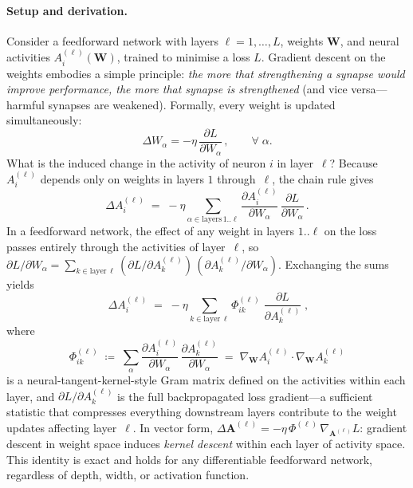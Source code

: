 \documentclass[10pt]{article}
\newcommand{\vW}{\mathbf{W}}
\newcommand{\vA}{\mathbf{A}}
\newcommand{\grad}{\nabla_{\!\vW}}
\begin{document}
\paragraph{Setup and derivation.}
Consider a feedforward network with layers $\ell=1,\ldots,L$, weights $\vW$, and neural activities $A_i^{(\ell)}(\vW)$, trained to minimise a loss $L$.  Gradient descent on the weights embodies a simple principle: \emph{the more that strengthening a synapse would improve performance, the more that synapse is strengthened} (and vice versa---harmful synapses are weakened).  Formally, every weight is updated simultaneously:
%
\begin{equation}
  \Delta W_\alpha = -\eta\,\frac{\partial L}{\partial W_\alpha}\,,
  \qquad \forall\;\alpha.
\end{equation}
%
What is the induced change in the activity of neuron $i$ in layer~$\ell$?
Because $A_i^{(\ell)}$ depends only on weights in layers $1$ through~$\ell$, the chain rule gives
%
\begin{equation}\label{eq:chain}
  \Delta A_i^{(\ell)}
  \;=\; -\eta \sum_{\alpha\in\text{layers}\,1..\ell} \frac{\partial A_i^{(\ell)}}{\partial W_\alpha}\,\frac{\partial L}{\partial W_\alpha}\,.
\end{equation}
%
In a feedforward network, the effect of any weight in layers $1..\ell$ on the loss passes entirely through the activities of layer~$\ell$, so $\partial L/\partial W_\alpha = \sum_{k\in\text{layer}\,\ell} (\partial L/\partial A_k^{(\ell)})\,(\partial A_k^{(\ell)}/\partial W_\alpha)$.  Exchanging the sums yields
%
\begin{equation}\label{eq:main}
  \boxed{\;\Delta A_i^{(\ell)} \;=\; -\eta \sum_{k\in\text{layer}\,\ell} \Phi^{(\ell)}_{ik}\;\frac{\partial L}{\partial A_k^{(\ell)}}\;,}
\end{equation}
%
where
%
\begin{equation}\label{eq:kernel}
  \Phi^{(\ell)}_{ik}
  \;\coloneqq\; \sum_\alpha \frac{\partial A_i^{(\ell)}}{\partial W_\alpha}\,\frac{\partial A_k^{(\ell)}}{\partial W_\alpha}
  \;=\; \grad A_i^{(\ell)} \cdot \grad A_k^{(\ell)}
\end{equation}
%
is a neural-tangent-kernel-style Gram matrix defined on the activities within each layer, and $\partial L/\partial A_k^{(\ell)}$ is the full backpropagated loss gradient---a sufficient statistic that compresses everything downstream layers contribute to the weight updates affecting layer~$\ell$.  In vector form, $\Delta\vA^{(\ell)} = -\eta\,\Phi^{(\ell)}\,\nabla_{\!\vA^{(\ell)}}L$: gradient descent in weight space induces \emph{kernel descent} within each layer of activity space.  This identity is exact and holds for any differentiable feedforward network, regardless of depth, width, or activation function.
\end{document}
